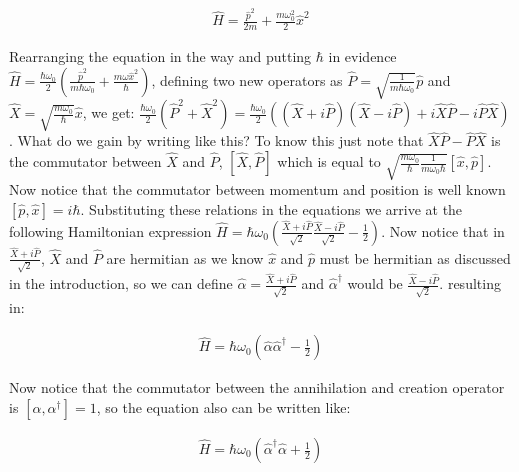 \documentclass[
  journal=largetwo,
  year=2023,
]{cup-journal}
\begin{document}
\begin{equation}
  \begin{aligned}\label{eq:9}
    \hat{H} = \frac{\hat{p}^2}{2m} + \frac{m\omega_0^{2}}{2}\hat{x}^2
  \end{aligned}
\end{equation}


Rearranging the equation in the way and putting \(\hbar\) in evidence \(\hat{H} = \frac{\hbar\omega_0}{2}(\frac{\hat{p}^2}{m\hbar\omega_0} + \frac{m\omega\hat{x}^2}{\hbar})\), defining two new operators as \(\hat{P} = \sqrt{\frac{1}{m\hbar\omega_0}}\hat{p}\) and \(\hat{X} = \sqrt{\frac{m\omega_0}{\hbar}}\hat{x}\), we get: \(\frac{\hbar\omega_0}{2}(\hat{P}^2 + \hat{X}^2) = \frac{\hbar\omega_0}{2}((\hat{X} + i\hat{P})(\hat{X} - i\hat{P}) + i\hat{X}\hat{P} - i\hat{P}\hat{X})\). What do we gain by writing like this? To know this just note that \(\hat{X}\hat{P} - \hat{P}\hat{X}\) is the commutator between \(\hat{X}\) and \(\hat{P}\), \([\hat{X}, \hat{P}]\) which is equal to \(\sqrt{\frac{m\omega_0}{\hbar}\frac{1}{m\omega_0\hbar}}[\hat{x}, \hat{p}]\). Now notice that the commutator between momentum and position is well known \([\hat{p}, \hat{x}] = i\hbar\). Substituting these relations in the equations we arrive at the following Hamiltonian expression \(\hat{H} = \hbar\omega_0(\frac{\hat{X} + i\hat{P}}{\sqrt{2}}\frac{\hat{X}-i\hat{P}}{\sqrt{2}} - \frac{1}{2})\). Now notice that in \(\frac{\hat{X} + i\hat{P}}{\sqrt{2}}\), \(\hat{X}\) and \(\hat{P}\) are hermitian as we know \(\hat{x}\)  and \(\hat{p}\) must be hermitian as discussed in the introduction, so we can define \(\hat{\alpha} = \frac{\hat{X} + i\hat{P}}{\sqrt{2}}\) and \(\hat{\alpha}^{\dag}\) would be \(\frac{\hat{X} - i\hat{P}}{\sqrt{2}}\). resulting in:

\begin{equation}
  \begin{aligned}\label{eq:10}
    \hat{H} = \hbar\omega_0(\hat{\alpha}\hat{\alpha}^{\dag} - \frac{1}{2})
  \end{aligned}
\end{equation}


Now notice that the commutator between the annihilation and creation operator is \([\alpha, \alpha^{\dag}] = 1\), so the equation also can be written like:

\begin{equation}
  \begin{aligned}\label{eq:10}
    \hat{H} = \hbar\omega_0(\hat{\alpha}^{\dag}\hat{\alpha} + \frac{1}{2})
  \end{aligned}
\end{equation}
\end{document}
